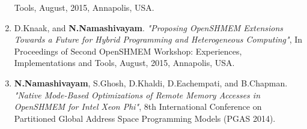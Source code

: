 \begin{enumerate}
      Tools, August, 2015, Annapolis, USA.
\item D.Knaak, and \textbf{N.Namashivayam}.
      \textit{"Proposing OpenSHMEM Extensions Towards a Future for Hybrid
      Programming and Heterogeneous Computing"}, In Proceedings of Second
      OpenSHMEM Workshop: Experiences, Implementations and Tools, August, 2015,
      Annapolis, USA.
\item \textbf{N.Namashivayam}, S.Ghosh, D.Khaldi, D.Eachempati, and B.Chapman.
      \textit{"Native Mode-Based Optimizations of Remote Memory Accesses in
      OpenSHMEM for Intel Xeon Phi"}, 8th International Conference on Partitioned
      Global Address Space Programming Models (PGAS 2014).
\end{enumerate}


